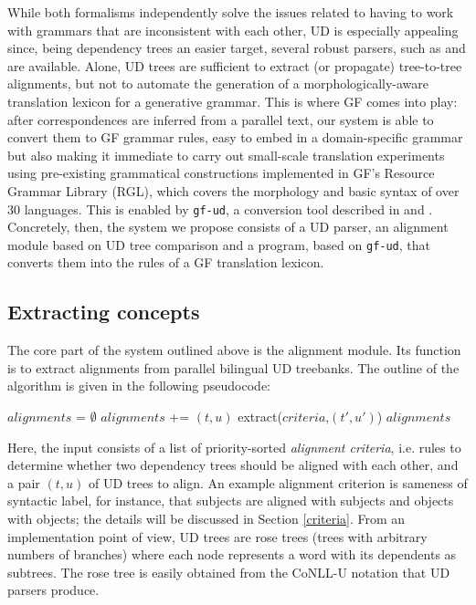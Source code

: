\documentclass[11pt]{article}
\begin{document}
While both formalisms independently solve the issues related to having to work with grammars that are inconsistent with each other, UD is especially appealing since, being dependency trees an easier target, several robust parsers, such as \cite{straka-etal-2016-udpipe} and \cite{chen-manning-2014-fast} are available.
Alone, UD trees are sufficient to extract (or propagate) tree-to-tree alignments, but not to automate the generation of a morphologically-aware translation lexicon for a generative grammar. 
This is where GF comes into play: after correspondences are inferred from a parallel text, our system is able to convert them to GF grammar rules, easy to embed in a domain-specific grammar but also making it immediate to carry out small-scale translation experiments using pre-existing grammatical constructions implemented in GF's Resource Grammar Library (RGL), which covers the morphology and basic syntax of over 30 languages.
This is enabled by \texttt{gf-ud}, a conversion tool described in \cite{kolachina-ranta-2016-abstract} and \cite{ranta-kolachina-2017-universal}.
Concretely, then, the system we propose consists of a UD parser, an alignment module based on UD tree comparison and a program, based on \texttt{gf-ud}, that converts them into the rules of a GF translation lexicon.

\subsection{Extracting concepts} 
The core part of the system outlined above is the alignment module. 
Its function is to extract alignments from parallel bilingual UD treebanks.
The outline of the algorithm is given in the following pseudocode:

\begin{algorithm} 
  \small
  \begin{algorithmic}
    \State $alignments$ = $\emptyset$
        \State $alignments$ += $(t,u)$
          \State extract($criteria$,$(t',u')$)
        \EndFor
    \EndIf
    \Return $alignments$
  \EndProcedure
  \end{algorithmic}
  \end{algorithm}

Here, the input consists of a list of priority-sorted \textit{alignment criteria}, i.e. rules to determine whether two dependency trees should be aligned with each other, and a pair $(t,u)$ of UD trees to align.
An example alignment criterion is sameness of syntactic label, for instance, that subjects are aligned with subjects and objects with objects; the details will be discussed in Section \ref{criteria}.  
From an implementation point of view, UD trees are rose trees (trees with arbitrary numbers of branches) where each node represents a word with its dependents as subtrees.
The rose tree is easily obtained from the CoNLL-U notation that UD parsers produce.
\end{document}

